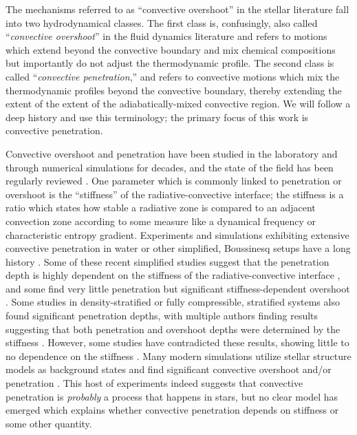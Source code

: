 \documentclass{aastex631}
\begin{document}
The mechanisms referred to as ``convective overshoot'' in the stellar literature fall into two hydrodynamical classes.
The first class is, confusingly, also called ``\emph{convective overshoot}'' in the fluid dynamics literature and refers to motions which extend beyond the convective boundary and mix chemical compositions but importantly do not adjust the thermodynamic profile.
The second class is called ``\emph{convective penetration},'' and refers to convective motions which mix the thermodynamic profiles beyond the convective boundary, thereby extending the extent of the extent of the adiabatically-mixed convective region.
We will follow a deep history \citep{zahn1991, brummell_etal_2002, korre_etal_2019} and use this terminology; the primary focus of this work is convective penetration.

Convective overshoot and penetration have been studied in the laboratory and through numerical simulations for decades, and the state of the field has been regularly reviewed \citep[e.g.,][]{marcus_etal_1983, zahn1991, browning_etal_2004, rogers_etal_2006, viallet_etal_2015, korre_etal_2019}.
One parameter which is commonly linked to penetration or overshoot is the ``stiffness'' of the radiative-convective interface; the stiffness is a ratio which states how stable a radiative zone is compared to an adjacent convection zone according to some measure like a dynamical frequency or characteristic entropy gradient.
Experiments and simulations exhibiting extensive convective penetration in water or other simplified, Boussinesq setups have a long history \citep{ musman1968, deardorff_etal_1969, moore_weiss_1973}.
Some of these recent simplified studies suggest that the penetration depth is highly dependent on the stiffness of the radiative-convective interface \citep{couston_etal_2017, toppaladoddi_wettlaufer_2018}, and some find very little penetration but significant stiffness-dependent overshoot \citep{korre_etal_2019}.
Some studies in density-stratified or fully compressible, stratified systems \citep[e.g.,][]{hurlburt_etal_1986, saikia_etal_2000} also found significant penetration depths, with multiple authors finding results suggesting that both penetration and overshoot depths were determined by the stiffness \citep{hurlburt_etal_1994, singh_etal_1995, browning_etal_2004, dietrich_wicht_2018}.
However, some studies have contradicted these results, showing little to no dependence on the stiffness \citep{brummell_etal_2002, rogers_glatzmaier_2005}.
Many modern simulations utilize stellar structure models as background states and find significant convective overshoot and/or penetration \citep{browning_etal_2004, rogers_etal_2006, kitiashvili_etal_2016, brun_etal_2017, pratt_etal_2017, higl_etal_2021}.
This host of experiments indeed suggests that convective penetration is \emph{probably} a process that happens in stars, but no clear model has emerged which explains whether convective penetration depends on stiffness or some other quantity.
\end{document}
